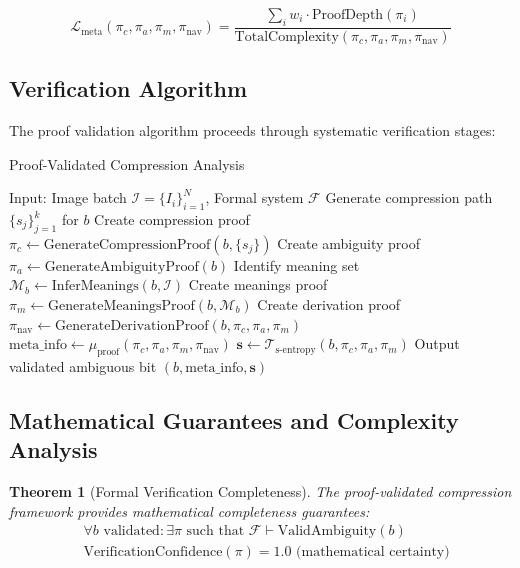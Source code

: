 \documentclass[11pt,a4paper]{article}
\newtheorem{theorem}{Theorem}[section]
\begin{document}
\begin{equation}
\mathcal{L}_{\text{meta}}(\pi_c, \pi_a, \pi_m, \pi_{\text{nav}}) = \frac{\sum_{i} w_i \cdot \text{ProofDepth}(\pi_i)}{\text{TotalComplexity}(\pi_c, \pi_a, \pi_m, \pi_{\text{nav}})}
\label{eq:metacognitive-level}
\end{equation}

\subsection{Verification Algorithm}

The proof validation algorithm proceeds through systematic verification stages:

\begin{algorithm}[H]
\caption{Proof-Validated Compression Analysis}
\begin{algorithmic}[1]
\STATE Input: Image batch $\mathcal{I} = \{I_i\}_{i=1}^N$, Formal system $\mathcal{F}$
    \STATE Generate compression path $\{s_j\}_{j=1}^k$ for $b$
    \STATE Create compression proof $\pi_c \leftarrow \text{GenerateCompressionProof}(b, \{s_j\})$
    \STATE Create ambiguity proof $\pi_a \leftarrow \text{GenerateAmbiguityProof}(b)$
    \STATE Identify meaning set $\mathcal{M}_b \leftarrow \text{InferMeanings}(b, \mathcal{I})$
    \STATE Create meanings proof $\pi_m \leftarrow \text{GenerateMeaningsProof}(b, \mathcal{M}_b)$
    \STATE Create derivation proof $\pi_{\text{nav}} \leftarrow \text{GenerateDerivationProof}(b, \pi_c, \pi_a, \pi_m)$
        \STATE $\text{meta\_info} \leftarrow \mu_{\text{proof}}(\pi_c, \pi_a, \pi_m, \pi_{\text{nav}})$
        \STATE $\mathbf{s} \leftarrow \mathcal{T}_{\text{s-entropy}}(b, \pi_c, \pi_a, \pi_m)$
        \STATE Output validated ambiguous bit $(b, \text{meta\_info}, \mathbf{s})$
    \ENDIF
\ENDFOR
\end{algorithmic}
\end{algorithm}

\subsection{Mathematical Guarantees and Complexity Analysis}

\begin{theorem}[Formal Verification Completeness]
The proof-validated compression framework provides mathematical completeness guarantees:
\begin{align}
&\forall b \text{ validated}: \exists \pi \text{ such that } \mathcal{F} \vdash \text{ValidAmbiguity}(b) \label{eq:completeness}\\
&\text{VerificationConfidence}(\pi) = 1.0 \text{ (mathematical certainty)} \label{eq:certainty}
\end{align}
\end{theorem}
\end{document}
